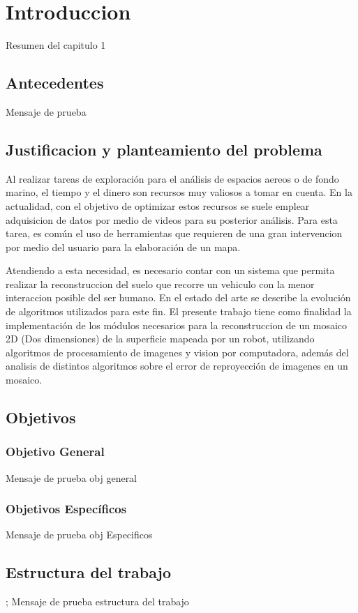 \chapter{Introduccion}
\label{capitulo1}

Resumen del capitulo 1

\section{Antecedentes}
Mensaje de prueba
\section{Justificacion y planteamiento del problema}


Al realizar tareas de exploración para el análisis de espacios aereos o de fondo marino, el tiempo y el dinero son recursos muy valiosos a tomar en cuenta. En la actualidad, con el objetivo de optimizar estos recursos se suele emplear adquisicion de datos por medio de videos para su posterior análisis. Para esta tarea, es común el uso de herramientas que requieren de una gran intervencion por medio del usuario para la elaboración de un mapa.
    
Atendiendo a esta necesidad, es necesario contar con un sistema que permita realizar la reconstruccion del suelo que recorre un vehiculo con la menor interaccion posible del ser humano. En el estado del arte se describe la evolución de algoritmos utilizados para este fin. El presente trabajo tiene como finalidad la implementación de los módulos necesarios para la reconstruccion de un mosaico 2D (Dos dimensiones) de la superficie mapeada por un robot, utilizando algoritmos de procesamiento de imagenes y vision por computadora, además del analisis de distintos algoritmos sobre el error de reproyección de imagenes en un mosaico.


\section{Objetivos}
\subsection{Objetivo General}
Mensaje de prueba obj general
\subsection{Objetivos Específicos}
Mensaje de prueba obj Especificos
\section{Estructura del trabajo};
Mensaje de prueba estructura del trabajo

